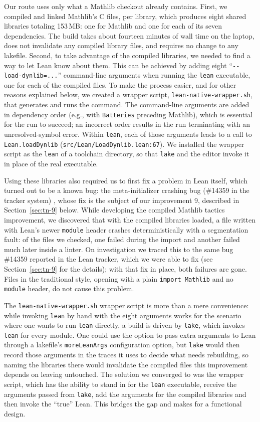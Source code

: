 \documentclass{article}
\newcommand{\Lean}{Lean\xspace}      %
\newcommand{\lean}{\texttt{lean}\xspace}      %
\newcommand{\lake}{\texttt{lake}\xspace}      %
\newcommand{\mathlib}{Mathlib\xspace}
\begin{document}
Our route uses only what a \mathlib checkout already contains. First, we compiled and linked \mathlib's C files, per library, which produces eight shared libraries totaling 153\,MB: one for \mathlib and one for each of its seven dependencies. The build takes about fourteen minutes of wall time on the laptop, does not invalidate any compiled library files, and requires no change to any lakefile.
Second, to take advantage of the compiled libraries, we needed to find a way to let \Lean know about them. This can be achieved by adding eight ``\texttt{-{}-load-dynlib=...}'' command-line arguments when running the \texttt{lean} executable, one for each of the compiled files. To make the process easier, and for other reasons explained below, we created a wrapper script, \texttt{lean-native-wrapper.sh}, that generates and runs the command. The command-line arguments are added in dependency order (e.g., with \texttt{Batteries} preceding \mathlib), which is essential for the run to succeed; an incorrect order results in the run terminating with an unresolved-symbol error.
Within \texttt{lean}, each of those arguments leads to a call to \texttt{Lean.loadDynlib} (\texttt{src/Lean/LoadDynlib.lean:67}). We installed the wrapper script as the \texttt{lean} of a toolchain directory, so that \lake and the editor invoke it in place of the real executable.

Using these libraries also required us to first fix a problem in \Lean itself, which turned out to be a known bug: the meta-initializer crashing bug (\#14359 in the tracker system) \cite{lean14359}, whose fix is the subject of our improvement 9, described in Section~\ref{sec:tn-9} below. While developing the compiled \mathlib tactics improvement, we discovered that with the compiled libraries loaded, a file written with \Lean's newer \texttt{module} header crashes deterministically with a segmentation fault: of the files we checked, one failed during the import and another failed much later inside a linter. On investigation we traced this to the same bug \#14359 reported in the \Lean tracker, which we were able to fix (see Section~\ref{sec:tn-9} for the details); with that fix in place, both failures are gone. Files in the traditional style, opening with a plain \texttt{import Mathlib} and no \texttt{module} header, do not cause this problem.

The \texttt{lean-native-wrapper.sh} wrapper script is more than a mere convenience: while invoking \lean by hand with the eight arguments works for the scenario where one wants to run \lean directly, a build is driven by \lake, which invokes \lean for every module. One could use the option to pass extra arguments to \Lean through a lakefile's \texttt{moreLeanArgs} configuration option, but \lake would then record those arguments in the traces it uses to decide what needs rebuilding, so naming the libraries there would invalidate the compiled files this improvement depends on leaving untouched. The solution we converged to was the wrapper script, which has the ability to stand in for the \lean executable, receive the arguments passed from \lake, add the arguments for the compiled libraries and then invoke the ``true'' \Lean. This bridges the gap and makes for a functional design.
\end{document}
